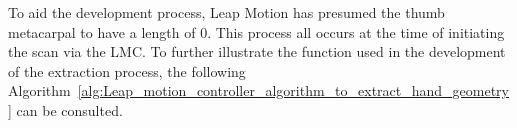 \renewcommand{\umltextcolor}{black}
\renewcommand{\umldrawcolor}{black}
\renewcommand{\umlfillcolor}{white}

\begin{center}
\end{center}


To aid the development process, Leap Motion has presumed the thumb metacarpal to have a length of 0.
This process all occurs at the time of initiating the scan via the LMC. To further illustrate the function used in the development of the extraction process, the following Algorithm~\ref{alg:Leap_motion_controller_algorithm_to_extract_hand_geometry} can be consulted.
    




